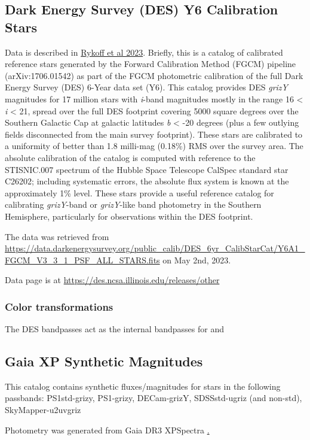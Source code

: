 \subsection{Dark Energy Survey (DES) Y6 Calibration Stars}
\label{sec:des}
Data is described in \href{https://arxiv.org/abs/2305.01695}{Rykoff et al 2023}. Briefly, this is a catalog of calibrated reference stars generated by the Forward Calibration Method (FGCM) pipeline (arXiv:1706.01542) as part of the FGCM photometric calibration of the full Dark Energy Survey (DES) 6-Year data set (Y6). This catalog provides DES \textit{grizY} magnitudes for 17 million stars with \textit{i}-band magnitudes mostly in the range 16 < \textit{i} < 21, spread over the full DES footprint covering 5000 square degrees over the Southern Galactic Cap at galactic latitudes \textit{b} < -20 degrees (plus a few outlying fields disconnected from the main survey footprint). These stars are calibrated to a uniformity of better than 1.8 milli-mag (0.18\%) RMS over the survey area. The absolute calibration of the catalog is computed with reference to the STISNIC.007 spectrum of the Hubble Space Telescope CalSpec standard star C26202; including systematic errors, the absolute flux system is known at the approximately 1\% level. These stars provide a useful reference catalog for calibrating \textit{grizY}-band or \textit{grizY}-like band photometry in the Southern Hemisphere, particularly for observations within the DES footprint.

The data was retrieved from \url{https://data.darkenergysurvey.org/public_calib/DES_6yr_CalibStarCat/Y6A1_FGCM_V3_3_1_PSF_ALL_STARS.fits} on May 2nd, 2023.

Data page is at \url{https://des.ncsa.illinois.edu/releases/other}

\subsubsection{Color transformations}
The DES bandpasses act as the internal bandpasses for \monster and 

\subsection{Gaia XP Synthetic Magnitudes}
\label{sec:gaiaxp}
This catalog contains synthetic fluxes/magnitudes for stars in the following passbands:
PS1std-grizy, PS1-grizy, DECam-grizY, SDSSstd-ugriz (and non-std), SkyMapper-u2uvgriz

Photometry was generated from Gaia DR3 XPSpectra \href{https://arxiv.org/abs/2206.06215}. 

